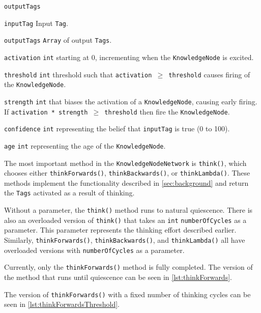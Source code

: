 \documentclass[titlepage,11pt]{article}
\def \knnpath {"C:/Users/Sean/IdeaProjects/Prometheus/src/knn/KnowledgeNodeNetwork.java"}
\newcommand{\ar}[1]{\autoref{#1}}
\newcommand{\code}[1]{\texttt{#1}}
\begin{document}
\begin{labeling}{\code{outputTags}}
	\item[\code{inputTag}] Input \code{Tag}.
	\item[\code{outputTags}] \code{Array} of output \code{Tags}.
	\item[\code{activation}] \code{int} starting at 0, incrementing when the \code{KnowledgeNode} is excited.
	\item[\code{threshold}] \code{int} threshold such that \code{activation $\geq$ threshold} causes firing of the \code{KnowledgeNode}.
	\item[\code{strength}] \code{int} that biases the activation of a \code{KnowledgeNode}, causing early firing. If \code{activation * strength $\geq$ threshold} then fire the \code{KnowledgeNode}.
	\item[\code{confidence}] \code{int} representing the belief that \code{inputTag} is true (0 to 100).
	\item[\code{age}] \code{int} representing the age of the \code{KnowledgeNode}.
\end{labeling}

The most important method in the \code{KnowledgeNodeNetwork} is \code{think()}, which chooses either \code{thinkForwards()}, \code{thinkBackwards()}, or \code{thinkLambda()}. These methods implement the functionality described in \ar{sec:background} and return the \code{Tags} activated as a result of thinking.

Without a parameter, the \code{think()} method runs to natural quiescence. There is also an overloaded version of \code{think()} that takes an \code{int} \code{numberOfCycles} as a parameter. This parameter represents the thinking effort described earlier. Similarly, \code{thinkForwards()}, \code{thinkBackwards()}, and \code{thinkLambda()} all have overloaded versions with \code{numberOfCycles} as a parameter.

Currently, only the \code{thinkForwards()} method is fully completed. The version of the method that runs until quiescence can be seen in \autoref{lst:thinkForwards}.



The version of \code{thinkForwards()} with a fixed number of thinking cycles can be seen in \autoref{lst:thinkForwardsThreshold}.


\end{document}
